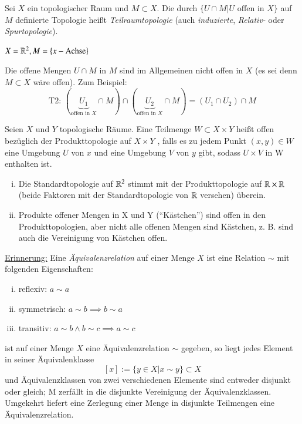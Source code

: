 \documentclass[a4paper,10pt]{scrartcl}
\begin{document}
\begin{df} Sei $ X $ ein topologischer Raum und $ M \subset X $. Die durch $ \{ U\cap M| U \text{ offen in } X \}$ auf $M$ definierte Topologie heißt \emph{Teilraumtopologie} (auch \emph{induzierte}, \emph{Relativ-} oder \emph{Spurtopologie}). 
\end{df}
\begin{ex*}
$X=\mathbb{R}^2, M=\{x-\text{Achse}\}$
\begin{figure}[ht]
\centering

\caption{}
\end{figure}
\end{ex*}
\begin{att*}
Die offene Mengen $U\cap M$ in $ M $ sind im Allgemeinen nicht offen in $ X $ (es sei denn $ M\subset X $ wäre offen). Zum Beispiel:
\[
\text{T2: } (\underbrace{U_1}_{\text{offen in }X}\cap M)\cap (\underbrace{U_2}_{\text{offen in }X}\cap M)=(U_1\cap U_2)\cap M
\]
\end{att*}
\begin{df}
Seien $ X $ und $ Y $ topologische Räume. Eine Teilmenge $ W\subset X\times Y $ heißt offen bezüglich der Produkttopologie auf $ X\times Y $ , falls es zu jedem Punkt $ (x,y)\in W $ eine Umgebung $ U $ von $ x $ und eine Umgebung $ V $ von $ y $ gibt, sodass $ U\times V $ in W enthalten ist.
\begin{figure}[ht]
\centering

\caption{}
\end{figure}
\end{df}
\begin{note*}
\begin{enumerate}[(i)]
\item Die Standardtopologie auf $ \mathbb{R}^2 $ stimmt mit der Produkttopologie auf $ \mathbb{R}\times \mathbb{R} $ (beide Faktoren mit der Standardtopologie von $ \mathbb{R} $ versehen) überein.
\item Produkte offener Mengen in X und Y ("`Kästchen"') sind offen in den Produkttopologien, aber nicht alle offenen Mengen sind Kästchen, z. B. sind auch die Vereinigung von Kästchen offen.\\
\begin{figure}[ht]
\centering

\caption{}
\end{figure}
\end{enumerate}
\underline{Erinnerung:} Eine \emph{Äquivalenzrelation} auf einer Menge $ X $ ist eine Relation $\sim$ mit folgenden Eigenschaften:
\begin{enumerate}[(i)]
\item reflexiv: $a\sim a$
\item symmetrisch: $a\sim b \implies b\sim a$
\item transitiv: $a\sim b \land b \sim c\implies a\sim c$
\end{enumerate}
ist auf einer Menge $ X $ eine Äquivalenzrelation $\sim$ gegeben, so liegt jedes Element in seiner Äquivalenklasse
\[
 [x]:=\{y\in X|x\sim y\} \subset X
\]
und Äquivalenzklassen von zwei verschiedenen Elemente sind entweder disjunkt oder gleich; M zerfällt in die disjunkte Vereinigung der Äquivalenzklassen.  Umgekehrt liefert eine Zerlegung einer Menge in disjunkte Teilmengen eine Äquivalenzrelation.
\end{note*}
\end{document}
